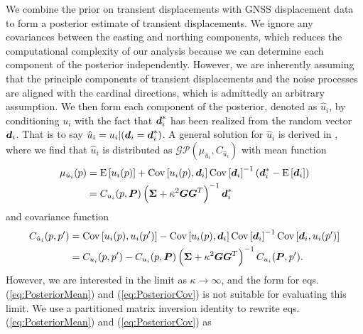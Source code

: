 \documentclass[extra,mreferee]{gji}
\begin{document}
We combine the prior on transient displacements with GNSS displacement data to form a posterior estimate of transient displacements. We ignore any covariances between the easting and northing components, which reduces the computational complexity of our analysis because we can determine each component of the posterior independently. However, we are inherently assuming that the principle components of transient displacements and the noise processes are aligned with the cardinal directions, which is admittedly an arbitrary assumption. We then form each component of the posterior, denoted as $\hat{u}_i$, by conditioning $u_i$ with the fact that $\mitbf{d}^*_i$ has been realized from the random vector $\mitbf{d}_i$. That is to say $\hat{u}_i = u_i |(\mitbf{d}_i = \mitbf{d}^*_i)$. A general solution for $\hat{u}_i$ is derived in \citet[sec. 8.9]{VonMises1964}, where we find that $\hat{u}_i$ is distributed as $\mathcal{GP}(\mu_{\hat{u}_i},C_{\hat{u}_i})$ with mean function
\begin{align}\label{eq:PosteriorMean}
\mu_{\hat{u}_i}(p) &= \mathrm{E}\left[u_i(p)\right] + 
                      \mathrm{Cov}\left[u_i(p),\mitbf{d}_i\right] 
                      \mathrm{Cov}\left[\mitbf{d}_i\right]^{-1}
                      \left(\mitbf{d}^*_i - \mathrm{E}\left[\mitbf{d}_i\right]\right)\nonumber \\
                   &= C_{u_i}(p,\mitbf{P})\left(\mitbf{\Sigma} + \kappa^2\mitbf{G}\mitbf{G}^T\right)^{-1}\mitbf{d}^*_i
\end{align}    
and covariance function
\begin{align}\label{eq:PosteriorCov}
C_{\hat{u}_i}(p,p') &= \mathrm{Cov}\left[u_i(p),u_i(p')\right] - 
                       \mathrm{Cov}\left[u_i(p),\mitbf{d}_i\right] 
                       \mathrm{Cov}\left[\mitbf{d}_i\right]^{-1}
                       \mathrm{Cov}\left[\mitbf{d}_i,u_i(p')\right]\nonumber \\
                    &= C_{u_i}(p,p') - C_{u_i}(p,\mitbf{P})\left(\mitbf{\Sigma} + \kappa^2\mitbf{G}\mitbf{G}^T\right)^{-1}C_{u_i}(\mitbf{P},p').
\end{align}
However, we are interested in the limit as $\kappa \to \infty$, and the form for eqs. (\ref{eq:PosteriorMean}) and (\ref{eq:PosteriorCov}) is not suitable for evaluating this limit. We use a partitioned matrix inversion identity \citep[sec. 2.7.4]{Press2007} to rewrite eqs. (\ref{eq:PosteriorMean}) and (\ref{eq:PosteriorCov}) as
\end{document}
